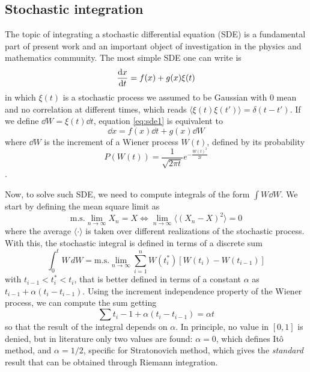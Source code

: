 \documentclass[../../master_thesis_np.tex]{subfiles}
\begin{document}
		\subsection{Stochastic integration}
		The topic of integrating a stochastic differential equation (SDE) is a fundamental part of present work and an important object of investigation in the physics and mathematics community. The most simple SDE one can write is
		\begin{equation} \label{eq:sde1}
			\dv{x}{t} = f(x) + g(x)\xi(t)
		\end{equation}
		in which $\xi(t)$ is a stochastic process we assumed to be Gaussian with 0 mean and no correlation at different times, which reads $ \langle \xi(t) \xi(t') \rangle = \delta(t-t')$. If we define  $\dd{W} = \xi(t)\dd{t}$, equation \ref{eq:sde1} is equivalent to
		\begin{equation} \label{eq:sde2}
			\dd{x} = f(x)\dd{t} + g(x)\dd{W} 
		\end{equation} 
		where $\dd{W}$ is the increment of a Wiener process $W(t)$, defined by its probability
		\begin{equation} 
			P(W(t)) = \frac{1}{\sqrt{2 \pi t}} e^{-\frac{W(t)^2}{2t}}
		\end{equation}
		.
		
		Now, to solve such SDE, we need to compute integrals of the form $\int W \dd{W}$. We start by defining the mean square limit as
		\begin{equation} 
			\text{m.s.} \lim_{n \to \infty} X_n = X \iff \lim_{n \to \infty} \langle(X_n - X)^2\rangle = 0 
		\end{equation}
		where the average $\langle \cdot \rangle$ is taken over different realizations of the stochastic process. With this, the stochastic integral is defined in terms of a discrete sum
		\begin{equation} 
			\int_0^t W \, dW = \text{m.s.} \lim_{n \to \infty} \sum_{i=1}^n W(t_i^*) \left[ W(t_i) - W(t_{i-1}) \right] 
		\end{equation}
		with $t_{i-1} < t_i^* < t_i$, that is better defined in terms of a constant $\alpha$ as $t_{i-1}+\alpha (t_i - t_{i-1})$. Using the increment independence property of the Wiener process, we can compute the sum getting 
		\begin{equation} 
			\sum t_i-1 + \alpha(t_i - t_{i-1}) = \alpha t 
		\end{equation}
		so that the result of the integral depends on $\alpha$. In principle, no value in $[0,1]$ is denied, but in literature only two values are found: $\alpha = 0$, which defines Itô method, and $\alpha = 1/2$, specific for Stratonovich method, which gives the \emph{standard} result that can be obtained through Riemann integration. 
		
\end{document}
